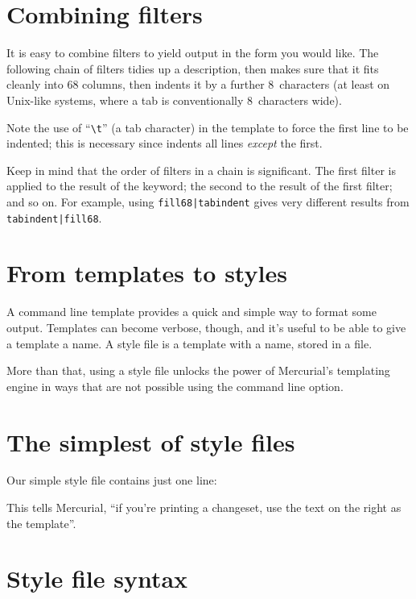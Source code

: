 {{\section{Combining filters}

It is easy to combine filters to yield output in the form you would
like.  The following chain of filters tidies up a description, then
makes sure that it fits cleanly into 68 columns, then indents it by a
further 8~characters (at least on Unix-like systems, where a tab is
conventionally 8~characters wide).


Note the use of ``\Verb+\t+'' (a tab character) in the template to
force the first line to be indented; this is necessary since
 indents all lines \emph{except} the first.

Keep in mind that the order of filters in a chain is significant.  The
first filter is applied to the result of the keyword; the second to
the result of the first filter; and so on.  For example, using
\Verb+fill68|tabindent+ gives very different results from
\Verb+tabindent|fill68+.


\section{From templates to styles}

A command line template provides a quick and simple way to format some
output.  Templates can become verbose, though, and it's useful to be
able to give a template a name.  A style file is a template with a
name, stored in a file.

More than that, using a style file unlocks the power of Mercurial's
templating engine in ways that are not possible using the command line
 option.

\section{The simplest of style files}

Our simple style file contains just one line:


This tells Mercurial, ``if you're printing a changeset, use the text
on the right as the template''.

\section{Style file syntax}

}}
